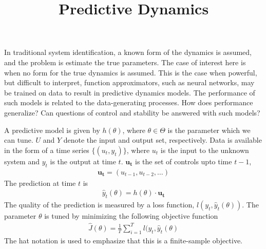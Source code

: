 \documentclass[a4paper, 11pt]{article}
\title{Predictive Dynamics}
\author{}
\date{}
\begin{document}
\maketitle

In traditional system identification, a known form of the dynamics is assumed,
and the problem is estimate the true parameters. The case of interest here is
when no form for the true dynamics is assumed. This is the case when powerful,
but difficult to interpret, function approximators, such as neural networks, may
be trained on data to result in predictive dynamics models. The performance of
such models is related to the data-generating processes. How does performance
generalize? Can questions of control and stability be answered with such models?

A predictive model is given by $h(\theta)$, where $\theta \in \Theta$ is the
parameter which we can tune. $U$ and $Y$ denote the input and output set,
respectively. Data is available in the form of a time series $\{(u_t,y_t)\}$,
where $u_t$ is the input to the unknown system and $y_t$ is the output at time
$t$. $\bm{u_t}$ is the set of controls upto time $t-1$,
\begin{align*}
  \bm{u_t} = (u_{t-1},u_{t-2},\dots)
\end{align*}
The prediction at time $t$ is 
\begin{align*}
  \hat{y}_t(\theta) = h(\theta)\cdot\bm{u_t}
\end{align*}
The quality of the prediction is measured by a loss function,
$l(y_t,\hat{y}_t(\theta))$. The parameter $\theta$ is tuned by minimizing the
following objective function
\begin{align}
  \hat{J}(\theta) = \frac{1}{T}\sum_{i=1}^Tl(y_t,\hat{y}_t(\theta)
\end{align}
The hat notation is used to emphasize that this is a finite-sample objective.
\end{document}
